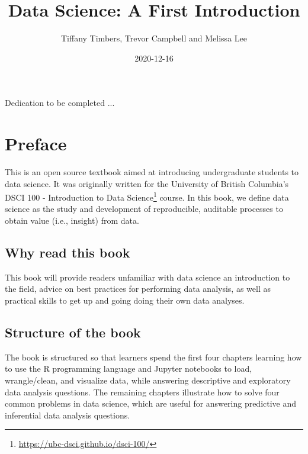 \documentclass[
]{krantz}
\title{Data Science: A First Introduction}
\author{Tiffany Timbers, Trevor Campbell and Melissa Lee}
\date{2020-12-16}
\renewcommand{\href}[2]{#2\footnote{\url{#1}}}
\begin{document}
\maketitle


\thispagestyle{empty}

\begin{center}
Dedication to be completed ...
\end{center}

\setlength{\abovedisplayskip}{-5pt}
\setlength{\abovedisplayshortskip}{-5pt}

{
\hypersetup{linkcolor=}
\setcounter{tocdepth}{2}
\tableofcontents
}
\listoftables
\listoffigures
\hypertarget{preface}{%
\chapter*{Preface}\label{preface}}


This is an open source textbook aimed at introducing undergraduate students to data science. It was originally written for the University of British Columbia's \href{https://ubc-dsci.github.io/dsci-100/}{DSCI 100 - Introduction to Data Science} course. In this book, we define data science as the study and development of reproducible, auditable processes to obtain value (i.e., insight) from data.

\hypertarget{why-read-this-book}{%
\section*{Why read this book}\label{why-read-this-book}}


This book will provide readers unfamiliar with data science an introduction to
the field, advice on best practices for performing data analysis, as well as
practical skills to get up and going doing their own data analyses.

\hypertarget{structure-of-the-book}{%
\section*{Structure of the book}\label{structure-of-the-book}}


The book is structured so that learners spend the first four chapters learning how to use the R programming language and Jupyter notebooks to load, wrangle/clean, and visualize data, while answering descriptive and exploratory data analysis questions. The remaining chapters illustrate how to solve four common problems in data science, which are useful for answering predictive and inferential data analysis questions.
\end{document}
